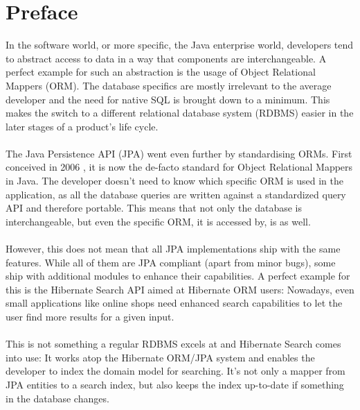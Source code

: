 \section{Preface}\label{Preface}
In the software world, or more specific, the Java enterprise world, developers tend to abstract access to data in a way that components are interchangeable. A perfect example for such an abstraction is the usage of Object Relational Mappers (ORM). The database specifics are mostly irrelevant to the average developer and the need for native SQL is brought down to a minimum. This makes the switch to a different relational database system (RDBMS) easier in the later stages of a product's life cycle.
\\\\
The Java Persistence API (JPA) went even further by standardising ORMs. First conceived in 2006 \cite{needed}, it is now the de-facto standard for Object Relational Mappers in Java. The developer doesn't need to know which specific ORM is used in the application, as all the database queries are written against a standardized query API and therefore portable. This means that not only the database is interchangeable, but even the specific ORM, it is accessed by, is as well.
\\\\
However, this does not mean that all JPA implementations ship with the same features. While all of them are JPA compliant (apart from minor bugs), some ship with additional modules to enhance their capabilities. A perfect example for this is the Hibernate Search API aimed at Hibernate ORM users: Nowadays, even small applications like online shops need enhanced search capabilities to let the user find more results for a given input.
\\\\
This is not something a regular RDBMS excels at and Hibernate Search comes into use: It works atop the Hibernate ORM/JPA system and enables the developer to index the domain model for searching. It's not only a mapper from JPA entities to a search index, but also keeps the index up-to-date if something in the database changes.
\\\\

